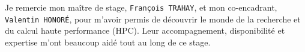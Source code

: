 

Je remercie mon maître de stage, \verb!François TRAHAY!, et mon co-encadrant, 
\verb!Valentin HONORÉ!, pour m’avoir permis de découvrir le monde de la recherche 
et du calcul haute performance (HPC). Leur accompagnement, disponibilité et expertise m’ont beaucoup aidé 
tout au long de ce stage.